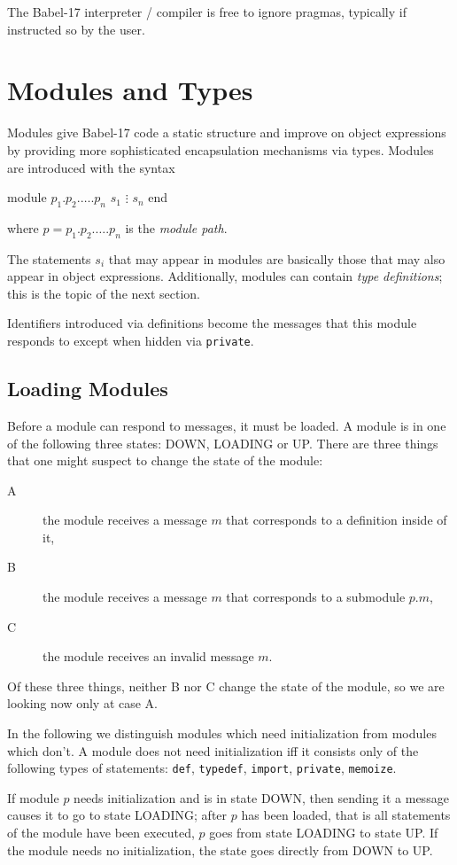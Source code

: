 \documentclass[11pt]{amsart}
\newcommand{\babelsrc}[1] {\lstinline!#1!}
\begin{document}
The Babel-17 interpreter / compiler is free to ignore pragmas, typically if instructed so by the user. 

\section{Modules and Types}\label{modules}
Modules give Babel-17 code a static structure and improve on object expressions by providing more sophisticated encapsulation mechanisms via types. Modules are introduced with the syntax
\begin{babellisting}
module $p_1.p_2.\ldots.p_n$
  $s_1$
  $\vdots$
  $s_n$  
end
\end{babellisting}
where $p = p_1.p_2.\ldots.p_n$ is the \emph{module path}. 

The statements $s_i$ that may appear in modules are basically those that may also appear in object expressions. Additionally, modules can contain \emph{type definitions}; this is the topic of the next section. 

Identifiers introduced via definitions become the messages that this module responds to except when hidden via \babelsrc{private}. 

\subsection{Loading Modules}
Before a module can respond to messages, it must be loaded. 
A module is in one of the following three states: DOWN, LOADING or UP. There are three things that one might  suspect to change the state of the module: 
\begin{description}
\item[A] the module receives a message $m$ that corresponds to a definition inside of it,
\item[B] the module receives a message $m$ that corresponds to a submodule $p.m$,
\item[C] the module receives an invalid message $m$.
\end{description}
Of these three things, neither B nor C change the state of the module, so we are looking now only at case A.

In the following we distinguish modules which need initialization from modules which don't. A module does not need initialization iff it consists only of the following types of statements: \babelsrc{def}, \babelsrc{typedef}, \babelsrc{import}, \babelsrc{private}, \babelsrc{memoize}. 

If module $p$ needs initialization and is in state DOWN, then sending it a message causes it to go to state LOADING; after $p$ has been loaded, that is all statements of the module have been executed, $p$ goes from state LOADING to state UP. If the module needs no initialization, the state goes directly from DOWN to UP.
\end{document}
